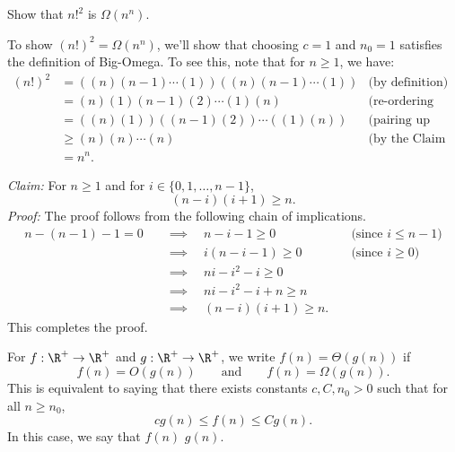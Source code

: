 \begin{flex}
\label{grp:exercise:Practice-with-big-Omega}

\begin{exercise}
\label{exercise:Practice-with-big-Omega}
Show that $n!^2$ is $\Omega(n^n)$.

\end{exercise}

\begin{solution}
\label{sol:time-complexity::re-ordering}
To show $(n!)^2 = \Omega(n^n)$, we'll show that choosing $c = 1$ and $n_0=1$ satisfies the definition of Big-Omega. To see this, note that for $n \geq 1$, we have:
\[ \begin{align*}
(n!)^2 & = \left((n)(n-1)\cdots (1)\right) \left((n)(n-1) \cdots (1)\right) & \text{(by definition)}\\ 
& = (n)(1)(n-1)(2) \cdots (1)(n) & \text{(re-ordering terms)}\\
& = ((n)(1))((n-1)(2)) \cdots ((1)(n)) & \text{(pairing up consecutive terms)} \\
& \geq (n)(n) \cdots (n) & \text{(by the Claim below)}\\
& = n^n.
\end{align*} \]

\noindent
\emph{Claim:} For $n \geq 1$ and for $i \in \{0,1,\ldots,n-1\}$,
\[
(n-i)(i+1) \geq n.
\]
\emph{Proof:} The proof follows from the following chain of implications. 
\[ \begin{align*}
n - (n-1) - 1 = 0 & \quad \implies \quad n-i-1 \geq 0 & \quad \text{(since $i \leq n-1$)} \\ 
& \quad \implies \quad i(n-i-1)  \geq 0  & \quad \text{(since $i \geq 0$)} \\
& \quad \implies \quad ni - i^2 - i \geq 0 & \\
& \quad \implies \quad ni - i^2 - i + n \geq n & \\
& \quad \implies \quad (n-i)(i+1) \geq n. &
\end{align*} \]
This completes the proof.

\end{solution}
\end{flex}

\begin{definition}[Theta]
\label{definition:Theta}
For $f: \R^+ \to \R^+$ and $g: \R^+ \to \R^+$, we write $f(n) = \Theta(g(n))$ if
\[
f(n) = O(g(n)) \quad \quad \text{and} \quad \quad f(n) = \Omega(g(n)).
\]
This is equivalent to saying that there exists constants $c,C,n_0 > 0$ such that for all $n \geq n_0$,
\[
cg(n) \leq f(n) \leq Cg(n).
\]
In this case, we say that $f(n)$  $g(n)$.

\end{definition}

